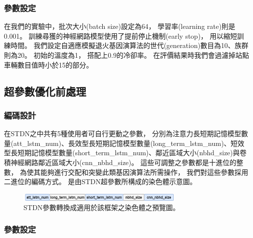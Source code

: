 \documentclass[a4paper,12pt]{extarticle}
\begin{document}
            \subsubsection{參數設定}
                \label{subsubsec:parameters_setting}
                在我們的實驗中，批次大小(batch size)設定為64，
                學習率(learning rate)則是0.001。
                訓練尋獲的神經網路模型使用了提前停止機制(early stop)，
                用以縮短訓練時間。
                我們設定自適應模擬退火基因演算法的世代(generation)數目為10、族群則為20。
                初始的溫度為1，
                搭配上0.9的冷卻率。
                在評價結果時我們會過濾掉站點車輛數目值時小於15的部分。

            \subsection{超參數優化前處理}
                \subsubsection{編碼設計}

                    在STDN之中共有5種使用者可自行更動之參數，
                    分別為注意力長短期記憶模型數量(att\_lstm\_num)、長效型長短期記憶模型數量(long\_term\_lstm\_num)、短效型長短期記憶模型數量(short\_term\_lstm\_num)、鄰近區域大小(nbhd\_size)與卷積神經網路鄰近區域大小(cnn\_nbhd\_size)。
                    這些可調整之參數都是十進位的整數，
                    為使其能夠進行交配和突變此類基因演算法所需操作，
                    我們對這些參數採用二進位的編碼方式。
                    是由STDN超參數所構成的染色體示意圖。
                    \begin{figure}[htbp]
                        \centering
                        \includegraphics[width=0.725\textwidth]{chromosome_sheme.png}
                        \caption{
                            STDN參數轉換成適用於該框架之染色體之預覽圖。
                        }
                        \label{fig:chromosome_sheme}
                    \end{figure}

                \subsubsection{參數設定}
\end{document}

